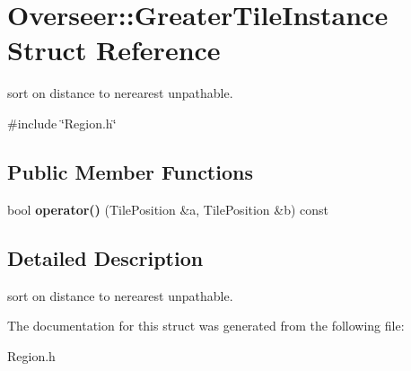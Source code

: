 \hypertarget{structOverseer_1_1GreaterTileInstance}{}\section{Overseer\+:\+:Greater\+Tile\+Instance Struct Reference}
\label{structOverseer_1_1GreaterTileInstance}


sort on distance to nerearest unpathable.  




{\ttfamily \#include \char`\"{}Region.\+h\char`\"{}}

\subsection*{Public Member Functions}
\begin{DoxyCompactItemize}
\item 
bool {\bfseries operator()} (Tile\+Position \&a, Tile\+Position \&b) const \hypertarget{structOverseer_1_1GreaterTileInstance_ad2cc6e19a01f100bb441ac1044b9147c}{}\label{structOverseer_1_1GreaterTileInstance_ad2cc6e19a01f100bb441ac1044b9147c}

\end{DoxyCompactItemize}


\subsection{Detailed Description}
sort on distance to nerearest unpathable. 

The documentation for this struct was generated from the following file\+:\begin{DoxyCompactItemize}
\item 
Region.\+h\end{DoxyCompactItemize}
